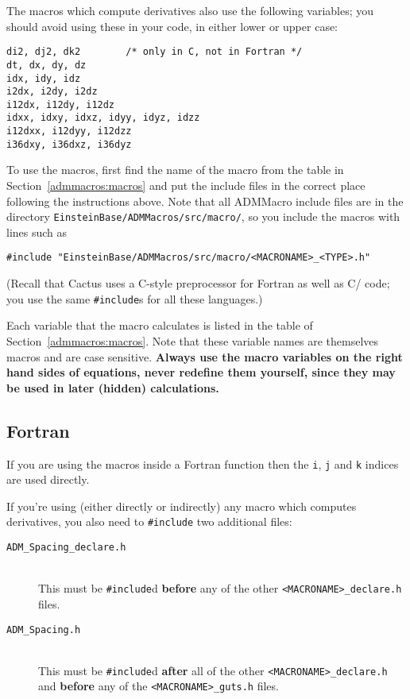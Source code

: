 The macros which compute derivatives also use the following variables;
you should avoid using these in your code, in either lower or upper case:
\begin{verbatim}
di2, dj2, dk2        /* only in C, not in Fortran */
dt, dx, dy, dz
idx, idy, idz
i2dx, i2dy, i2dz
i12dx, i12dy, i12dz
idxx, idxy, idxz, idyy, idyz, idzz
i12dxx, i12dyy, i12dzz
i36dxy, i36dxz, i36dyz
\end{verbatim}

To use the macros, first find the name of the macro from the table in
Section~\ref{admmacros:macros} and put the include files in the
correct place following the instructions above. Note that all ADMMacro
include files are in the directory \texttt{EinsteinBase/ADMMacros/src/macro/},
so you include the macros with lines such as
\begin{verbatim}
#include "EinsteinBase/ADMMacros/src/macro/<MACRONAME>_<TYPE>.h"
\end{verbatim}
(Recall that Cactus uses a C-style preprocessor for Fortran as well as
C/\Cplusplus{} code; you use the same \texttt{\#include}s for all these
languages.)

Each variable that the macro calculates is listed in the table of
Section~\ref{admmacros:macros}.  Note that these variable names are
themselves macros and are case sensitive. \textbf{Always use the macro
variables on the right hand sides of equations, never redefine them
yourself, since they may be used in later (hidden) calculations.}

\subsection{Fortran}

If you are using the macros inside a Fortran function then the
\texttt{i}, \texttt{j} and \texttt{k} indices are used directly.

If you're using (either directly or indirectly) any macro which computes
derivatives, you also need to \texttt{\#include} two additional files:
\begin{description}
\item[\texttt{ADM\_Spacing\_declare.h}]\mbox{}\\
	This must be \texttt{\#include}d \textbf{before} any of the
	other \texttt{<MACRONAME>\_declare.h} files.
\item[\texttt{ADM\_Spacing.h}]\mbox{}\\
	This must be \texttt{\#include}d \textbf{after} all of the
	other \texttt{<MACRONAME>\_declare.h} and \textbf{before}
	any of the \texttt{<MACRONAME>\_guts.h} files.
\end{description}

